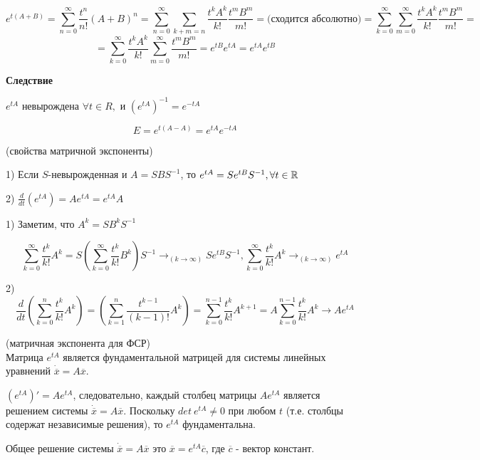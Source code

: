 \Proof

$$e^{t(A+B)} = \sum_{n=0}^{\infty} \frac{t^n}{n!} (A+B)^n = \sum_{n=0}^{\infty} \sum_{k+m=n} \frac{t^k A^k}{k!} \frac{t^m B^m}{m!} =\text{(сходится абсолютно)}=\sum_{k=0}^{\infty} \sum_{m=0}^{\infty} \frac{t^k A^k}{k!} \frac{t^m B^m}{m!} =$$ 
$$= \sum_{k=0}^{\infty} \frac{t^k A^k}{k!} \sum_{m=0}^{\infty} \frac{t^m B^m}{m!} = e^{tB} e^{tA} = e^{tA} e^{tB}$$

\EndProof

\textbf{Следствие} 

$e^{tA}$ невырождена $\forall t \in R,$ и $(e^{tA})^{-1} = e^{-tA}$

\Proof

$$E = e^{t(A-A)} = e^{tA} e^{-tA}$$

\EndProof

\Lemma (свойства матричной экспоненты)

1) Если $S$-невырожденная и $A = SBS^{-1}$, то $e^{tA} = Se^{tB}S^{-1}, \forall t \in \mathbb{R}$

2) $\frac{d}{dt}(e^{tA}) = Ae^{tA} = e^{tA}A$

\Proof

1) Заметим, что $A^k = SB^kS^{-1}$

$$\sum_{k=0}^{\infty} \frac{t^k}{k!}A^k = S (\sum_{k=0}^{\infty} \frac{t^k}{k!}B^k) S^{-1} \rightarrow_{(k \rightarrow \infty)} S e^{tB} S^{-1}, \sum_{k=0}^{\infty} \frac{t^k}{k!}A^k \rightarrow_{(k \rightarrow \infty)} e^{tA}$$

2) $$\frac{d}{dt} (\sum_{k=0}^n \frac{t^k}{k!} A^k) = (\sum_{k=1}^n \frac{t^{k-1}}{(k-1)!} A^k) = \sum_{k=0}^{n-1} \frac{t^{k}}{k!} A^{k+1} = A \sum_{k=0}^{n-1} \frac{t^{k}}{k!} A^{k} \rightarrow A e^{tA}$$

\EndProof

\Th (матричная экспонента для ФСР)\\
Матрица $e^{tA}$ является фундаментальной матрицей для системы линейных уравнений $\dot{\overline{x}} = A \overline{x}$.

\Proof

$(e^{tA})' = Ae^{tA}$, следовательно, каждый столбец матрицы  $Ae^{tA}$ является решением системы $\dot{\overline{x}} = A \overline{x}$. Поскольку $det\  e^{tA} \neq 0$ при любом $t$ (т.е. столбцы содержат независимые решения), то $e^{tA}$ фундаментальна.
\EndProof

Общее решение системы $\dot{\overline{x}} = A \overline{x}$ это $\overline{x} = e^{tA} \overline{c}$, где $\overline{c}$ - вектор констант.

